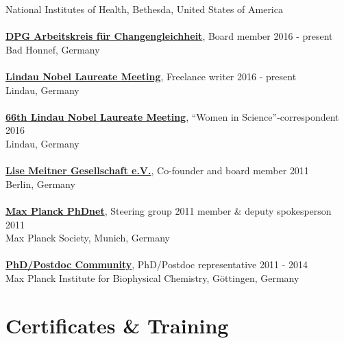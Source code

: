 \documentclass[margin,line]{res}
\begin{document}
\begin{resume}
National Institutes of Health, Bethesda, United States of America\\
\vspace*{-3mm}\\
{\bf  \href{https://www.dpg-physik.de/vereinigungen/fachuebergreifend/ak/akc}{DPG Arbeitskreis für Changengleichheit}}, Board member \hfill {2016 - present}\\
Bad Honnef, Germany\\
\vspace*{-3mm}\\
{\bf \href{https://www.lindau-nobel.org/blog-women-in-research-at-lino70/}{Lindau Nobel Laureate Meeting}}, Freelance writer \hfill {2016 - present}\\
Lindau, Germany\\
\vspace*{-3mm}\\
{\bf \href{https://www.br.de/fernsehen/ard-alpha/sendungen/alpha-forum/alpha-forum-extra-spitzenforschung-102.html}{66th Lindau Nobel Laureate Meeting}}, “Women in Science”-correspondent \hfill {2016}\\
Lindau, Germany\\
\vspace*{-3mm}\\
{\bf \href{https://www.lise-meitner-gesellschaft.org/}{Lise Meitner Gesellschaft e.V.}}, Co-founder and board member \hfill {2011}\\
Berlin, Germany\\
\vspace*{-3mm}\\
{\bf \href{https://www.phdnet.mpg.de/home}{Max Planck PhDnet}}, Steering group 2011 member \& deputy spokesperson \hfill {2011}\\
Max Planck Society, Munich, Germany\\
\vspace*{-3mm}\\
{\bf  \href{https://www.mpibpc.mpg.de/phdcom}{PhD/Postdoc Community}}, PhD/Postdoc representative \hfill {2011 - 2014}\\
Max Planck Institute for Biophysical Chemistry, Göttingen, Germany\\


\section{\sc Certificates \& Training}


\end{resume}
\end{document}

